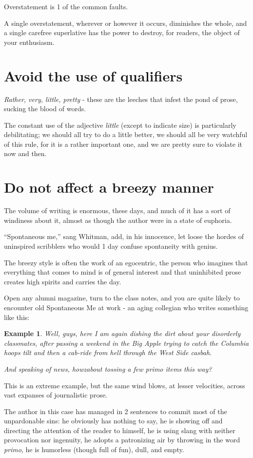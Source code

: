 \documentclass{book}
\numberwithin{equation}{section}
\newtheorem{example}{Example}[chapter]
\begin{document}
Overstatement is 1 of the common faults.

A single overstatement, wherever or however it occurs, diminishes the whole, and a single carefree superlative has the power to destroy, for readers, the object of your enthusiasm.

\section{Avoid the use of qualifiers}
\textit{Rather, very, little, pretty} - these are the leeches that infest the pond of prose, sucking the blood of words.

The constant use of the adjective \textit{little} (except to indicate size) is particularly debilitating; we should all try to do a little better, we should all be very watchful of this rule, for it is a rather important one, and we are pretty sure to violate it now and then.

\section{Do not affect a breezy manner}
The volume of writing is enormous, these days, and much of it has a sort of windiness about it, almost as though the author were in a state of euphoria.

``Spontaneous me,'' sang Whitman, add, in his innocence, let loose the hordes of uninspired scribblers who would 1 day confuse spontaneity with genius.

%
The breezy style is often the work of an egocentric, the person who imagines that everything that comes to mind is of general interest and that uninhibited prose creates high spirits and carries the day.

Open any alumni magazine, turn to the class notes, and you are quite likely to encounter old Spontaneous Me at work - an aging collegian who writes something like this:
\begin{example}
    Well, guys, here I am again dishing the dirt about your disorderly classmates, after passing a weekend in the Big Apple trying to catch the Columbia hoops tilt and then a cab-ride from hell through the West Side casbah.
   
   And speaking of news, howzabout tossing a few primo items this way?
\end{example}
This is an extreme example, but the same wind blows, at lesser velocities, across vast expanses of journalistic prose.

The author in this case has managed in 2 sentences to commit most of the unpardonable sins: he obviously has nothing to say, he is showing off and directing the attention of the reader to himself, he is using slang with neither provocation nor ingenuity, he adopts a patronizing air by throwing in the word \textit{primo}, he is humorless (though full of fun), dull, and empty.
\end{document}
